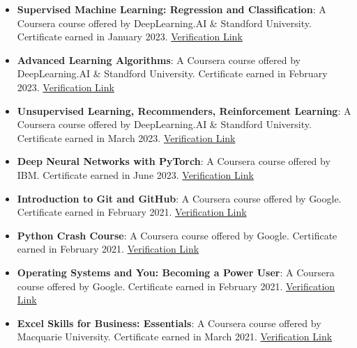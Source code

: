 \documentclass[letterpaper, 11pt]{article}
\begin{document}
\begin{itemize}[leftmargin=*]

	\item \textbf{Supervised Machine Learning: Regression and Classification}: A
    Coursera course offered by DeepLearning.AI \& Standford University. Certificate
    earned in January 2023.
	\href{https://www.coursera.org/account/accomplishments/certificate/VD8VT99H89J5}
    {Verification Link}

	\item \textbf{Advanced Learning Algorithms}: A  Coursera course offered by
    DeepLearning.AI \& Standford University. Certificate earned in February 2023.
	\href{https://www.coursera.org/account/accomplishments/certificate/7PRNGGJZ7YBR}
    {Verification Link}

	\item \textbf{Unsupervised Learning, Recommenders, Reinforcement Learning}: A
     Coursera course offered by DeepLearning.AI \& Standford University. Certificate
     earned in March 2023.
	 \href{https://www.coursera.org/account/accomplishments/certificate/CTH6L4SBUL7S}
     {Verification Link}

	\item \textbf{Deep Neural Networks with PyTorch}: A Coursera course offered by IBM.
     Certificate earned in June 2023.
	\href{https://www.coursera.org/account/accomplishments/certificate/VW9E3WQXYPJ9}
    {Verification Link}

	\item \textbf{Introduction to Git and GitHub}: A Coursera course offered by Google.
    Certificate earned in February 2021.
	\href{https://www.coursera.org/account/accomplishments/certificate/3H3N24N688CQ}
    {Verification Link}

	\item \textbf{Python Crash Course}: A Coursera course offered by Google. Certificate
    earned in February 2021.
	\href{https://www.coursera.org/account/accomplishments/certificate/ULTQVPQLDMZU}
    {Verification Link}

	\item \textbf{Operating Systems and You: Becoming a Power User}: A Coursera course
    offered by Google. Certificate earned in February 2021.
	\href{https://www.coursera.org/account/accomplishments/certificate/3N5CTQHU47X3}
    {Verification Link}

	\item \textbf{Excel Skills for Business: Essentials}: A Coursera course offered by
    Macquarie University. Certificate earned in March 2021.
	\href{https://www.coursera.org/account/accomplishments/certificate/7DPNK2A4CHMX}
    {Verification Link}

\end{itemize}
\end{document}
